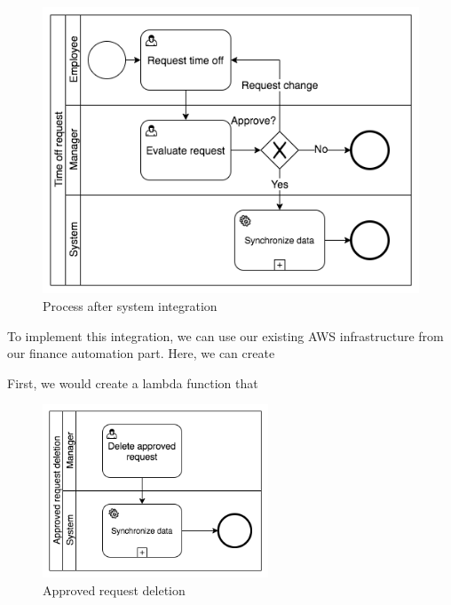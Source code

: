\documentclass[12pt,oneside]{fithesis2}
\begin{document}
    \begin{figure}[H]
        \centering
        \includegraphics[width=\textwidth]{after_sys_integration.png}
        \caption{Process after system integration}
        \label{fig:after_sys_integration}
    \end{figure}
    
    To implement this integration, we can use our existing AWS infrastructure from our finance automation part. Here, we can create 
    
    First, we would create a lambda function that 
    
    \begin{figure}[H]
        \centering
        \includegraphics[width=0.6\textwidth]{delete_approved.png}
        \caption{Approved request deletion}
        \label{fig:delete_approved}
    \end{figure}
    
    
\end{document}
